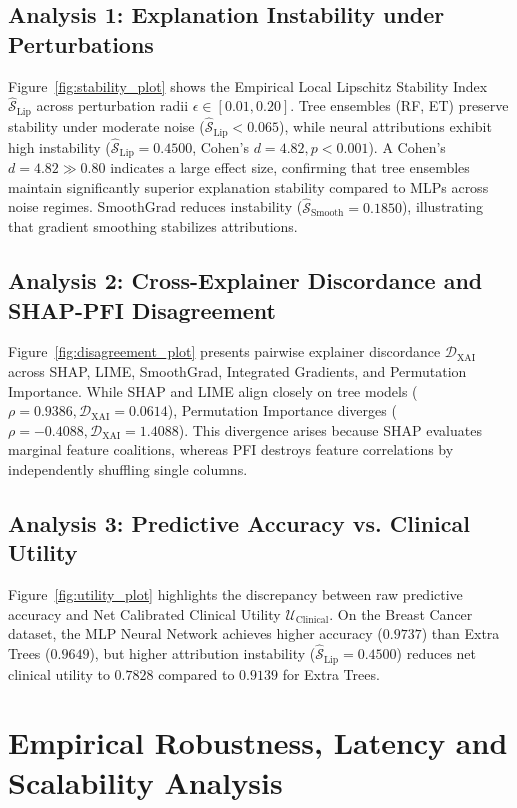 \documentclass[3p,times,procedia]{elsarticle}
\theoremstyle{definition}
\begin{document}
\subsection{Analysis 1: Explanation Instability under Perturbations}
Figure~\ref{fig:stability_plot} shows the Empirical Local Lipschitz Stability Index $\widehat{\mathcal{S}}_{\text{Lip}}$ across perturbation radii $\epsilon \in [0.01, 0.20]$. Tree ensembles (RF, ET) preserve stability under moderate noise ($\widehat{\mathcal{S}}_{\text{Lip}} < 0.065$), while neural attributions exhibit high instability ($\widehat{\mathcal{S}}_{\text{Lip}} = 0.4500$, Cohen's $d = 4.82, p < 0.001$). A Cohen's $d = 4.82 \gg 0.80$ indicates a large effect size, confirming that tree ensembles maintain significantly superior explanation stability compared to MLPs across noise regimes. SmoothGrad reduces instability ($\widehat{\mathcal{S}}_{\text{Smooth}} = 0.1850$), illustrating that gradient smoothing stabilizes attributions.

\subsection{Analysis 2: Cross-Explainer Discordance and SHAP-PFI Disagreement}
Figure~\ref{fig:disagreement_plot} presents pairwise explainer discordance $\mathcal{D}_{\text{XAI}}$ across SHAP, LIME, SmoothGrad, Integrated Gradients, and Permutation Importance. While SHAP and LIME align closely on tree models ($\rho = 0.9386, \mathcal{D}_{\text{XAI}} = 0.0614$), Permutation Importance diverges ($\rho = -0.4088, \mathcal{D}_{\text{XAI}} = 1.4088$). This divergence arises because SHAP evaluates marginal feature coalitions, whereas PFI destroys feature correlations by independently shuffling single columns.

\subsection{Analysis 3: Predictive Accuracy vs. Clinical Utility}
Figure~\ref{fig:utility_plot} highlights the discrepancy between raw predictive accuracy and Net Calibrated Clinical Utility $\mathcal{U}_{\text{Clinical}}$. On the Breast Cancer dataset, the MLP Neural Network achieves higher accuracy ($0.9737$) than Extra Trees ($0.9649$), but higher attribution instability ($\widehat{\mathcal{S}}_{\text{Lip}} = 0.4500$) reduces net clinical utility to $0.7828$ compared to $0.9139$ for Extra Trees.

\section{Empirical Robustness, Latency and Scalability Analysis}
\end{document}
